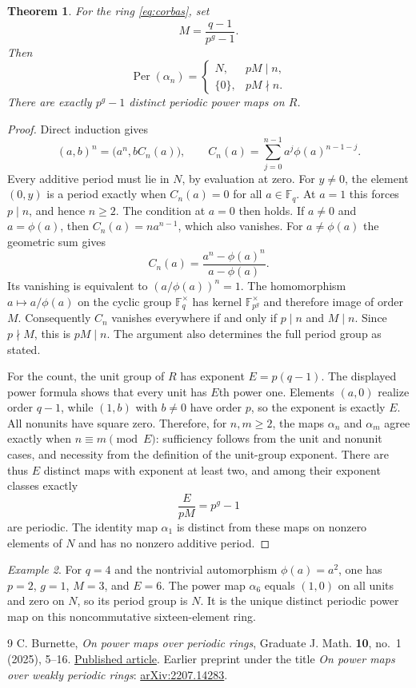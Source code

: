 \documentclass[11pt]{article}
\newtheorem{theorem}{Theorem}
\theoremstyle{remark}
\newtheorem{example}[theorem]{Example}
\DeclareMathOperator{\Per}{Per}
\begin{document}
\begin{theorem}\label{thm:corbas}
For the ring \eqref{eq:corbas}, set
\[
 M=\frac{q-1}{p^g-1}.
\]
Then
\[
 \Per(\alpha_n)=
 \begin{cases}
 N,&pM\mid n,\\
 \{0\},&pM\nmid n.
 \end{cases}
\]
There are exactly $p^g-1$ distinct periodic power maps on $R$.
\end{theorem}
\begin{proof}
Direct induction gives
\[
 (a,b)^n=\bigl(a^n,bC_n(a)\bigr),\qquad
 C_n(a)=\sum_{j=0}^{n-1}a^j\phi(a)^{n-1-j}.
\]
Every additive period must lie in $N$, by evaluation at zero. For $y\ne0$,
the element $(0,y)$ is a period exactly when $C_n(a)=0$ for all
$a\in\mathbb F_q$. At $a=1$ this forces $p\mid n$, and hence $n\geq2$.
The condition at $a=0$ then holds. If $a\ne0$ and $a=\phi(a)$, then
$C_n(a)=na^{n-1}$, which also vanishes. For $a\ne\phi(a)$ the geometric
sum gives
\[
 C_n(a)=\frac{a^n-\phi(a)^n}{a-\phi(a)}.
\]
Its vanishing is equivalent to $(a/\phi(a))^n=1$.
The homomorphism $a\mapsto a/\phi(a)$ on the cyclic group
$\mathbb F_q^\times$ has kernel $\mathbb F_{p^g}^\times$ and therefore
image of order $M$. Consequently $C_n$ vanishes everywhere if and only
if $p\mid n$ and $M\mid n$. Since $p\nmid M$, this is $pM\mid n$.
The argument also determines the full period group as stated.

For the count, the unit group of $R$ has exponent $E=p(q-1)$.
The displayed power formula shows that every unit has $E$th power one.
Elements $(a,0)$ realize order $q-1$, while $(1,b)$ with $b\ne0$ have
order $p$, so the exponent is exactly $E$.
All nonunits have square zero. Therefore, for $n,m\geq2$, the maps
$\alpha_n$ and $\alpha_m$ agree exactly when $n\equiv m\pmod E$:
sufficiency follows from the unit and nonunit cases, and necessity from
the definition of the unit-group exponent.
There are thus $E$ distinct maps with exponent at least two, and among
their exponent classes exactly
\[
 \frac{E}{pM}=p^g-1
\]
are periodic. The identity map $\alpha_1$ is distinct from these maps on
nonzero elements of $N$ and has no nonzero additive period.
\end{proof}

\begin{example}
For $q=4$ and the nontrivial automorphism $\phi(a)=a^2$, one has
$p=2$, $g=1$, $M=3$, and $E=6$. The power map $\alpha_6$ equals
$(1,0)$ on all units and zero on $N$, so its period group is $N$.
It is the unique distinct periodic power map on this noncommutative
sixteen-element ring.
\end{example}

\begin{thebibliography}{9}
C. Burnette,
\emph{On power maps over periodic rings},
Graduate J. Math. \textbf{10}, no.~1 (2025), 5--16.
\href{https://gradmath.org/wp-content/uploads/2025/07/GJM2025-Burnette.pdf}{Published article}.
Earlier preprint under the title \emph{On power maps over weakly periodic rings}:
\href{https://arxiv.org/abs/2207.14283}{arXiv:2207.14283}.
\end{thebibliography}
\end{document}
